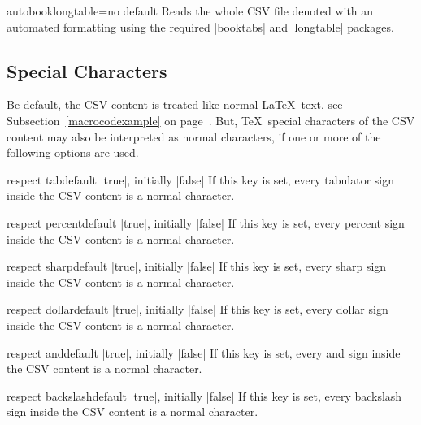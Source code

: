 \documentclass[a4paper,11pt]{ltxdoc}
\begin{document}
\begin{docCsvKey}{autobooklongtable}{=}{no default}
  Reads the whole CSV file denoted  with an automated formatting
  using the required |booktabs| and |longtable| packages.
\end{docCsvKey}


\clearpage
\subsection{Special Characters}\label{subsec:specchar}
Be default, the CSV content is treated like normal \LaTeX\ text, see
Subsection~\ref{macrocodexample} on page~\pageref{macrocodexample}.
But, \TeX\ special characters of the CSV content may also be interpreted
as normal characters, if one or more of the following options are used.

\begin{docCsvKey}{respect tab}{}{default |true|, initially |false|}
  If this key is set, every
  tabulator sign
  inside the CSV content is a normal character.
\end{docCsvKey}

\begin{docCsvKey}{respect percent}{}{default |true|, initially |false|}
  If this key is set, every
  percent sign \verbbox{\%}
  inside the CSV content is a normal character.
\end{docCsvKey}

\begin{docCsvKey}{respect sharp}{}{default |true|, initially |false|}
  If this key is set, every
  sharp sign \verbbox{\#}
  inside the CSV content is a normal character.
\end{docCsvKey}

\begin{docCsvKey}{respect dollar}{}{default |true|, initially |false|}
  If this key is set, every
  dollar sign \verbbox{\$}
  inside the CSV content is a normal character.
\end{docCsvKey}

\begin{docCsvKey}{respect and}{}{default |true|, initially |false|}
  If this key is set, every
  and sign \verbbox{\&}
  inside the CSV content is a normal character.
\end{docCsvKey}

\begin{docCsvKey}{respect backslash}{}{default |true|, initially |false|}
  If this key is set, every
  backslash sign \verbbox{\textbackslash}
  inside the CSV content is a normal character.
\end{docCsvKey}
\end{document}
